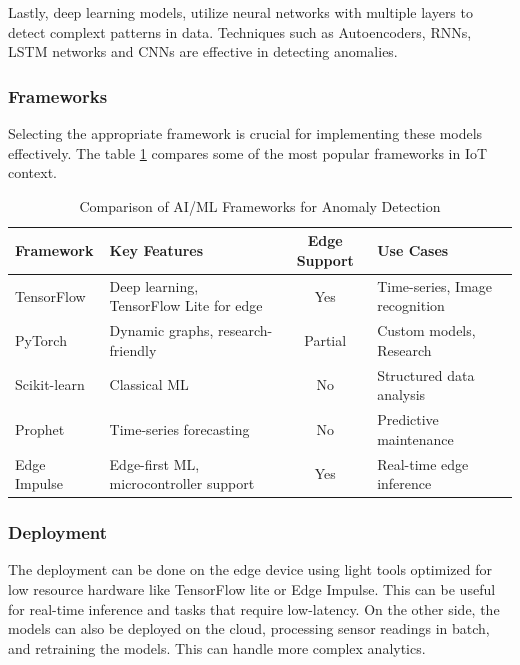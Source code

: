 Lastly, deep learning models, utilize neural networks with multiple layers
to detect complext patterns in data. Techniques such as Autoencoders, \gls{RNN}s,
\gls{LSTM} networks and \gls{CNN}s are effective in detecting anomalies\cite{BHAROT2024574}.

\subsubsection{Frameworks}
Selecting the appropriate framework is crucial for implementing these models
effectively. The table \ref{tab:ai-ml:frameworks}
compares some of the most popular frameworks in \gls{IoT} context.

\begin{table}[ht]
	\centering
	\caption{Comparison of \gls{AI}/\gls{ML} Frameworks for Anomaly Detection}
	\label{tab:ai-ml:frameworks}
	\begin{tabular}{p{3cm}p{4cm}cp{4cm}}
		\toprule
		\textbf{Framework} & \textbf{Key Features}                        & \textbf{Edge Support} & \textbf{Use Cases}             \\
		\midrule
		TensorFlow         & Deep learning, TensorFlow Lite for edge      & Yes                   & Time-series, Image recognition \\
		\midrule
		PyTorch            & Dynamic graphs, research-friendly            & Partial               & Custom models, Research        \\
		\midrule
		Scikit-learn       & Classical \gls{ML}                           & No                    & Structured data analysis       \\
		\midrule
		Prophet            & Time-series forecasting                      & No                    & Predictive maintenance         \\
		\midrule
		Edge Impulse       & Edge-first \gls{ML}, microcontroller support & Yes                   & Real-time edge inference       \\
		\bottomrule
	\end{tabular}
\end{table}

\subsubsection{Deployment}

The deployment can be done on the edge device using light tools optimized for
low resource hardware like TensorFlow lite or Edge Impulse. This can be useful
for real-time inference and tasks that require low-latency.
On the other side, the models can also be deployed on the cloud, processing
sensor readings in batch, and retraining the models. This can handle more
complex analytics.

